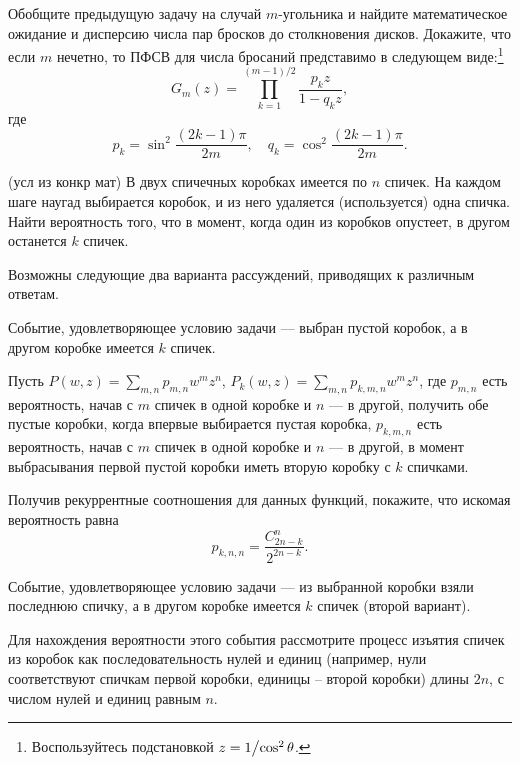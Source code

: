 \begin{problem}
Обобщите предыдущую задачу на случай $m$-угольника и найдите 
математическое ожидание и дисперсию числа пар бросков до столкновения 
дисков. Докажите, что если $m$ нечетно, то ПФСВ для числа бросаний 
представимо в следующем виде:\footnote{ Воспользуйтесь подстановкой $z=1 
\mathord{\left/ {\vphantom {1 {\cos ^2\theta }}} \right. 
\kern-\nulldelimiterspace} {\cos ^2\theta }$.}
\[
G_m (z)=\prod\limits_{k=1}^{(m-1)/2} {\frac{p_k z}{1-q_k z}} ,
\]
где
\[
p_k =\sin ^2\frac{(2k-1)\pi }{2m},
\quad
q_k =\cos ^2\frac{(2k-1)\pi }{2m}.
\]
\end{problem}


\begin{problem}(усл из конкр мат)
В двух спичечных коробках имеется по $n$ спичек. На каждом шаге наугад выбирается коробок, и из него удаляется (используется) 
одна спичка. Найти вероятность того, что в момент, когда один из коробков опустеет, в другом останется $k$ спичек. 
\end{problem}

\begin{ordre}

Возможны следующие два варианта рассуждений, приводящих к различным ответам.

Событие, удовлетворяющее условию задачи --- выбран пустой коробок, а в другом коробке имеется $k$ спичек. 


Пусть $P(w,z)=\sum\limits_{m,n} p_{m,n} w^m z^n$, 
$P_k(w,z)=\sum\limits_{m,n} p_{k,m,n} w^m z^n$,
где $p_{m,n}$ есть вероятность, начав с $m$ спичек в одной коробке и $n$ --- в другой, получить обе пустые коробки, 
когда впервые выбирается пустая коробка, 
$p_{k,m,n}$ есть вероятность, начав с $m$ спичек в одной коробке и $n$ --- в другой, в момент выбрасывания  первой пустой коробки иметь вторую коробку с $k$ спичками. 

Получив рекуррентные соотношения для данных функций, покажите, что искомая вероятность равна 
$$
p_{k,n,n}=\frac{C_{2n-k}^n}{2^{2n-k}} . 
$$


Событие, удовлетворяющее условию задачи --- из выбранной коробки взяли последнюю спичку, а в другом коробке имеется $k$ спичек (второй вариант). 

Для нахождения вероятности этого события рассмотрите процесс изъятия спичек из коробок как последовательность нулей и единиц (например, нули соответствуют спичкам первой коробки, 
единицы -- второй коробки) длины $2n$, с числом нулей и единиц равным $n$. 
\end{ordre}

